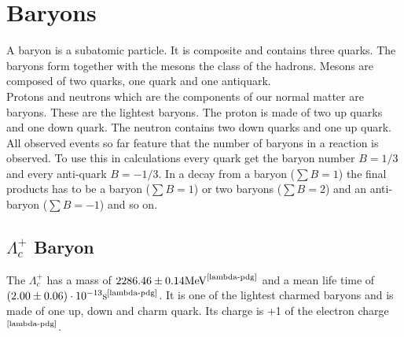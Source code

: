 \section{Baryons}
A baryon is a subatomic particle. It is composite and contains three quarks.
The baryons form together with the mesons the class of the hadrons. Mesons are 
composed of two quarks, one quark and one antiquark.\\
Protons and neutrons which are the components of our normal matter are baryons. 
These are the lightest baryons. The proton is made of two up quarks and one down 
quark. The neutron contains two down quarks and one up quark.\\
All observed events so far feature that the number of baryons in a reaction is 
observed. To use this in calculations every quark get the baryon number \(B = 1/3\) and 
every anti-quark \(B = -1/3\). In a decay from a baryon (\(\sum B = 1\)) the final 
products has to be a baryon (\(\sum B = 1\)) or two baryons (\(\sum B = 2\)) 
and an anti-baryon (\(\sum B = -1\)) and so on. 

\subsection{\(\Lambda_c^+\) Baryon}
The \(\Lambda_c^+\) has a mass of \(2286.46 \pm 0.14 \text{MeV}^
{\text{\cite{lambda-pdg}}}\) and a mean life time of \(\left( 2.00 \pm 0.06\right)
\cdot 10^{-13} \text{s}^{\text{\cite{lambda-pdg}}}\). It is one of the lightest charmed 
baryons and is made of one up, down and charm quark. Its charge is +1 of the 
electron charge\(^{\text{\cite{lambda-pdg}}}\).

